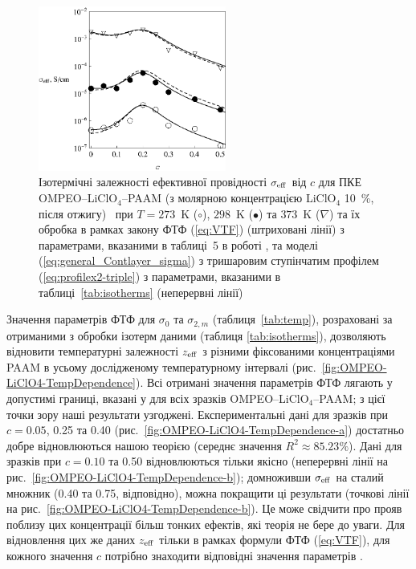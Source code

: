 \documentclass[14pt,twoside]{vakthesis}
\begin{document}
\begin{figure}[tb]
	\centering
	\includegraphics[width=0.55\textwidth]{Fig6_Isochores.eps}
	\caption{\label{fig:OMPEO-LiClO4-Temp} Ізотермічні залежності ефективної провідності $\sigma_{\rm eff}$ від $c$ для ПКЕ OMPEO--LiClO$_4$--PAAM (з молярною концентрацією LiClO$_4$ 10~\%, після отжигу)~\cite{Wiec1994} при $T=273$~K ($\circ$), $298$~K ($\bullet$) та $373$~K ($\nabla$) та їх обробка в рамках закону ФТФ (\ref{eq:VTF})  (штриховані лінії) з параметрами, вказаними в таблиці~5 в роботі \cite{Wiec1994}, та моделі (\ref{eq:general_Contlayer_sigma}) з тришаровим ступінчатим профілем (\ref{eq:profilex2-triple}) з параметрами, вказаними в таблиці~\ref{tab:isotherms} (неперервні лінії)}
\end{figure}

Значення параметрів ФТФ для $\sigma_0$ та $\sigma_{2,m}$ (таблиця~\ref{tab:temp}), розраховані за отриманими з обробки ізотерм даними (таблиця \ref{tab:isotherms}), дозволяють відновити температурні залежності ${z}_{\rm eff}$ з різними фіксованими концентраціями PAAM в усьому дослідженому температурному інтервалі (рис.~\ref{fig:OMPEO-LiClO4-TempDependence}). Всі отримані значення параметрів ФТФ лягають у допустимі границі, вказані у \cite{Wiec1994} для всіх зразків OMPEO--LiClO$_4$--PAAM; з цієї точки зору наші результати узгоджені.
Експериментальні дані для зразків при $c=0.05$, 0.25 та 0.40 (рис.~\ref{fig:OMPEO-LiClO4-TempDependence-a}) достатньо добре відновлюються нашою теорією {\color{violet}(середнє значення $R^2\approx 85.23\%$)}. Дані для зразків при $c=0.10$ та 0.50 відновлюються тільки якісно (неперервні лінії на рис.~\ref{fig:OMPEO-LiClO4-TempDependence-b}); домноживши $\sigma_{\rm eff}$ на сталий множник (0.40 та 0.75, відповідно), можна покращити ці результати (точкові лінії на рис.~\ref{fig:OMPEO-LiClO4-TempDependence-b}). Це може свідчити про прояв поблизу цих концентрації більш тонких ефектів, які теорія не бере до уваги.
Для відновлення цих же даних ${z}_{\rm eff}$ тільки в рамках формули ФТФ (\ref{eq:VTF}), для кожного значення $c$ потрібно знаходити відповідні значення параметрів \cite{Wiec1994}. 
\end{document}

